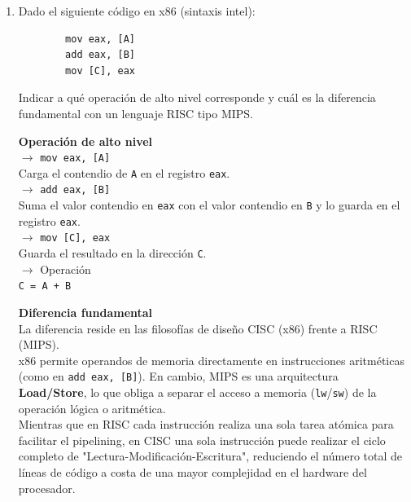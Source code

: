 \documentclass[a4paper, 11pt]{article}
\newcommand{\Pspace}{0.5cm}
\newcommand{\Aspace}{0.2cm}
\newcommand{\mips}[1]{\texttt{#1}}
\newcommand{\asm}[1]{\texttt{#1}}
\begin{document}
\begin{enumerate}
    \vspace{\Pspace}
    \item Dado el siguiente código en x86 (sintaxis intel): \par
    \begin{verbatim}
        mov eax, [A]
        add eax, [B]
        mov [C], eax
    \end{verbatim}
    Indicar a qué operación de alto nivel corresponde y cuál es la diferencia fundamental con un lenguaje RISC tipo MIPS.
        \vspace{\Aspace} \par
        { \color{azul}  
            \textbf{Operación de alto nivel} \\
            $\rightarrow$ \asm{mov eax, [A]} \\
            Carga el contendio de \asm{A} en el registro \asm{eax}. \\
            
            $\rightarrow$ \asm{add eax, [B]} \\
            Suma el valor contendio en \asm{eax} con el valor contendio en \asm{B} y lo guarda en el registro \asm{eax}. \\
                
            $\rightarrow$ \asm{mov [C], eax} \\
            Guarda el resultado en la dirección \asm{C}. \\

            $\rightarrow$ Operación \\
            \mips{C = A + B} \par

            \textbf{Diferencia fundamental} \\
            La diferencia reside en las filosofías de diseño CISC (x86) frente a RISC (MIPS). \\
            x86 permite operandos de memoria directamente en instrucciones aritméticas (como en \asm{add eax, [B]}). En cambio, MIPS es una arquitectura \textbf{Load/Store}, lo que obliga a separar el acceso a memoria (\mips{lw}/\mips{sw}) de la operación lógica o aritmética. \\
            Mientras que en RISC cada instrucción realiza una sola tarea atómica para facilitar el pipelining, en CISC una sola instrucción puede realizar el ciclo completo de "Lectura-Modificación-Escritura", reduciendo el número total de líneas de código a costa de una mayor complejidad en el hardware del procesador.
        }




\end{enumerate}
\end{document}

